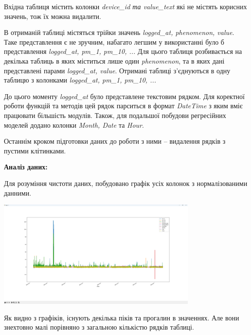 \documentclass{article}
\begin{document}
Вхідна таблиця містить колонки \textit{device\_id та value\_text} які не містять корисних значень, тож їх можна видалити.\indent

В отриманій таблиці містяться трійки значень \textit{logged\_at, phenomenon, value}. Таке представлення є не зручним, набагато легшим у використанні було б представлення \textit{logged\_at, pm\_1, pm\_10, ...} Для цього таблиця розбивається на декілька таблиць в яких міститься лише один \textit{phenomenon}, та в яких дані представлені парами \textit{logged\_at, value}. Отримані таблиці з'єднуються в одну таблицю з колонками \textit{logged\_at, pm\_1, pm\_10, ...}\indent

До цього моменту \textit{logged\_at} було представлене текстовим рядком. Для коректної роботи функцій та методів цей рядок парситься в формат \textit{DateTime} з яким вміє працювати більшість модулів. Також, для подальшої побудови регресійних моделей додано колонки \textit{Month, Date} та \textit{Hour}.\indent

Останнім кроком підготовки даних до роботи з ними -- видалення рядків з пустими клітинками.\indent
\newpage


\textbf{Аналіз даних:}\\\indent    

Для розуміння чистоти даних, побудовано графік усіх колонок з нормалізованими данними.\\\indent
\begin{center}
    \includegraphics[width=100mm]{norm}
\end{center}

Як видно з графіків, існують декілька піків та прогалин в значеннях. Але вони знехтовно малі порівняно з загальною кількістю рядків таблиці.\\\indent
\end{document}
